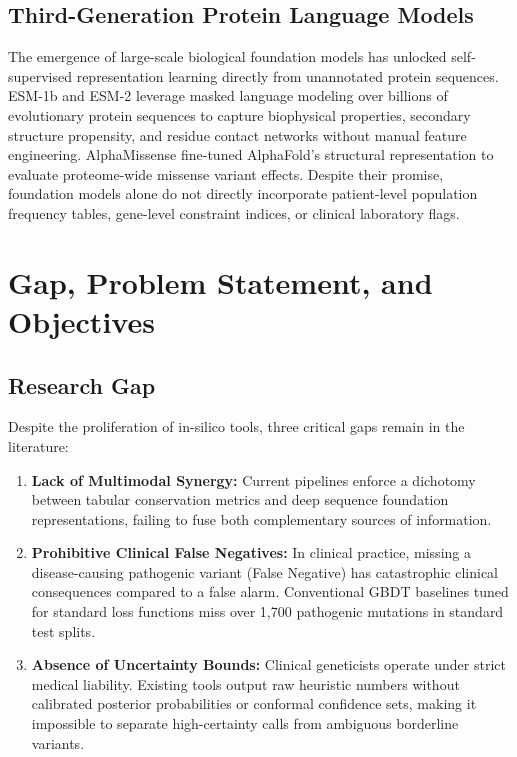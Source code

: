 \documentclass[conference]{IEEEtran}
\begin{document}
\subsection{Third-Generation Protein Language Models}
The emergence of large-scale biological foundation models has unlocked self-supervised representation learning directly from unannotated protein sequences. ESM-1b and ESM-2 \cite{lin2023evolutionary} leverage masked language modeling over billions of evolutionary protein sequences to capture biophysical properties, secondary structure propensity, and residue contact networks without manual feature engineering. AlphaMissense \cite{cheng2023accurate} fine-tuned AlphaFold's structural representation to evaluate proteome-wide missense variant effects. Despite their promise, foundation models alone do not directly incorporate patient-level population frequency tables, gene-level constraint indices, or clinical laboratory flags.

\section{Gap, Problem Statement, and Objectives}

\subsection{Research Gap}
Despite the proliferation of in-silico tools, three critical gaps remain in the literature:
\begin{enumerate}
    \item \textbf{Lack of Multimodal Synergy:} Current pipelines enforce a dichotomy between tabular conservation metrics and deep sequence foundation representations, failing to fuse both complementary sources of information.
    \item \textbf{Prohibitive Clinical False Negatives:} In clinical practice, missing a disease-causing pathogenic variant (False Negative) has catastrophic clinical consequences compared to a false alarm. Conventional GBDT baselines tuned for standard loss functions miss over 1,700 pathogenic mutations in standard test splits.
    \item \textbf{Absence of Uncertainty Bounds:} Clinical geneticists operate under strict medical liability. Existing tools output raw heuristic numbers without calibrated posterior probabilities or conformal confidence sets, making it impossible to separate high-certainty calls from ambiguous borderline variants.
\end{enumerate}
\end{document}
